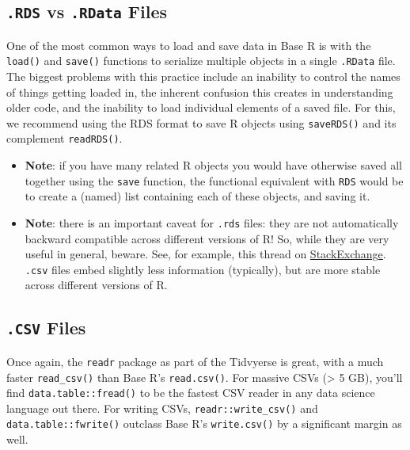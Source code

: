 \documentclass[]{book}
\begin{document}
\hypertarget{rds-vs-.rdata-files}{%
\subsection{\texorpdfstring{\texttt{.RDS} vs \texttt{.RData} Files}{.RDS vs .RData Files}}\label{rds-vs-.rdata-files}}

One of the most common ways to load and save data in Base R is with the \texttt{load()} and \texttt{save()} functions to serialize multiple objects in a single \texttt{.RData} file. The biggest problems with this practice include an inability to control the names of things getting loaded in, the inherent confusion this creates in understanding older code, and the inability to load individual elements of a saved file. For this, we recommend using the RDS format to save R objects using \texttt{saveRDS()} and its complement \texttt{readRDS()}.

\begin{itemize}
\item
  \textbf{Note}: if you have many related R objects you would have otherwise saved all together using the \texttt{save} function, the functional equivalent with \texttt{RDS} would be to create a (named) list containing each of these objects, and saving it.
\item
  \textbf{Note}: there is an important caveat for \texttt{.rds} files: they are not automatically backward compatible across different versions of R! So, while they are very useful in general, beware. See, for example, this thread on \href{https://stackoverflow.com/questions/56704638/write-a-file-using-saverds-so-that-it-is-backwards-compatible-with-old-versi}{StackExchange}. \texttt{.csv} files embed slightly less information (typically), but are more stable across different versions of R.
\end{itemize}

\hypertarget{csv-files}{%
\subsection{\texorpdfstring{\texttt{.CSV} Files}{.CSV Files}}\label{csv-files}}

Once again, the \texttt{readr} package as part of the Tidvyerse is great, with a much faster \texttt{read\_csv()} than Base R's \texttt{read.csv()}. For massive CSVs (\textgreater{} 5 GB), you'll find \texttt{data.table::fread()} to be the fastest CSV reader in any data science language out there. For writing CSVs, \texttt{readr::write\_csv()} and \texttt{data.table::fwrite()} outclass Base R's \texttt{write.csv()} by a significant margin as well.
\end{document}
